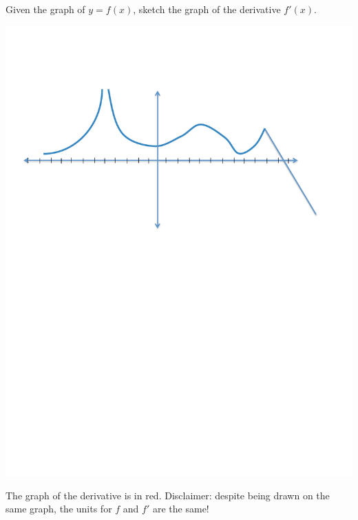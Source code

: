 \documentclass[handout,nooutcomes]{ximera}
\begin{document}
\begin{problem}
Given the graph of $y=f(x)$, sketch the graph of the derivative $f'(x)$.

	\begin{image}
	\includegraphics[trim= 220 430 250 110]{Figure5.pdf}
	\end{image}

		\begin{freeResponse}
		The graph of the derivative is in red.  Disclaimer:  despite being drawn on the same graph, the units for $f$ and $f'$ are  the same!
		

\end{freeResponse}
\end{problem}
\end{document}

